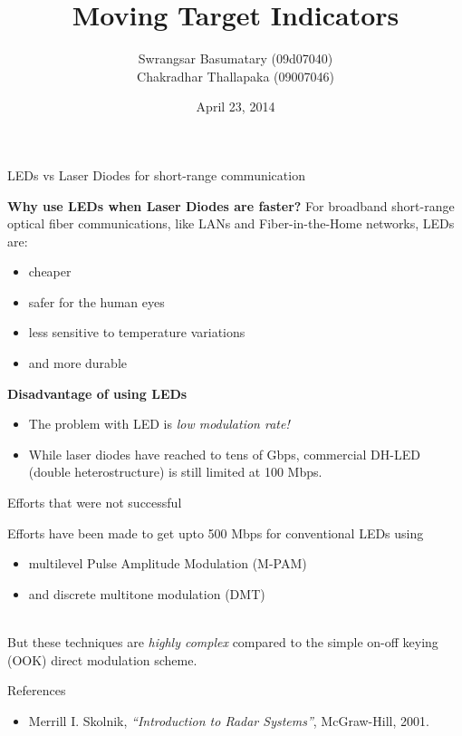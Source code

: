 \documentclass[mathserif]{beamer}
\title{Moving Target Indicators}
\author{Swrangsar Basumatary (09d07040) \\ Chakradhar Thallapaka (09007046)}
\institute{Department of Electrical Engineering \\ IIT Bombay, Powai}
\date{April 23, 2014}
\begin{document}
    \frame{\titlepage}
    
    \begin{frame}{LEDs vs Laser Diodes for short-range communication}

\textbf{Why use LEDs when Laser Diodes are faster?}
            For broadband short-range optical fiber communications, like
LANs and Fiber-in-the-Home networks, LEDs are:
            
            \begin{itemize}
                \item cheaper
                \item safer for the human eyes
                \item less sensitive to temperature variations
                \item and more durable
            \end{itemize}
  
        
        \textbf{Disadvantage of using LEDs}
            \begin{itemize}
                 \item The problem with LED is  \emph{low modulation rate!}\\
                 \item While laser diodes have reached to tens of Gbps, 
                commercial DH-LED (double heterostructure) is still limited at 100 Mbps.
            \end{itemize}
        
    \end{frame}
    
    \begin{frame}{Efforts that were not successful}
        
        Efforts have been made to get upto 500 Mbps for conventional LEDs using
        \begin{itemize}
             \item multilevel Pulse Amplitude Modulation (M-PAM)
             \item and discrete multitone modulation (DMT) \\~\\
        \end{itemize}
        
         But these techniques are \emph{highly complex} compared to the simple on-off keying (OOK) direct modulation scheme.
    \end{frame}
    
    
    
 
    
    \begin{frame}{References}
        
        \begin{itemize}
                 \item Merrill I. Skolnik, \emph{``Introduction to Radar Systems''}, McGraw-Hill, 2001.
        \end{itemize}
    \end{frame}
    
    
\end{document}
